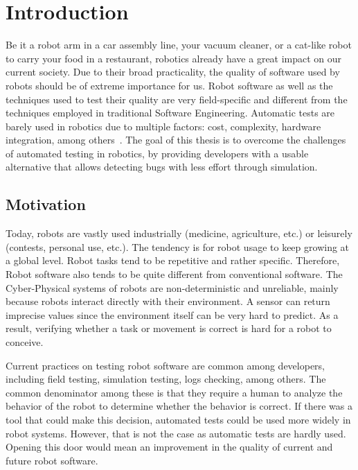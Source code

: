 \chapter{Introduction}
\label{chap:introduction}

Be it a robot arm in a car assembly line, your vacuum cleaner, or a cat-like robot to carry 
your food in a restaurant, robotics already have a great impact on our current society. 
Due to their broad practicality, the quality of software 
used by robots should be of extreme importance for us.
Robot software as well as the techniques used to test their quality are very 
field-specific and different from the techniques employed in traditional Software Engineering.
Automatic tests are barely used in robotics due to multiple factors:
cost, complexity, hardware integration, among others~\cite{TestRob}.
The goal of this thesis is to overcome the challenges of automated 
testing in robotics, by providing developers with a usable alternative 
that allows detecting bugs with less effort through simulation.


\section{Motivation}
\label{sec:motivation}

Today, robots are vastly used industrially (medicine, agriculture, etc.) 
or leisurely (contests, personal use, etc.).
The tendency is for robot usage to keep growing at a global level.
Robot tasks tend to be repetitive and rather specific.
Therefore, Robot software also tends to be quite different from conventional software.
The Cyber-Physical systems of robots are non-deterministic and unreliable, 
mainly because robots interact directly with their environment.
A sensor can return imprecise values since the environment itself can be very hard to predict.
As a result, verifying whether a task or movement is correct is hard for a robot to conceive.

\par

Current practices on testing robot software are common among developers, 
including field testing, simulation testing, logs checking, among others.
The common denominator among these is that they require a human to analyze 
the behavior of the robot to determine whether the behavior is correct. 
If there was a tool that could make this decision, automated tests 
could be used more widely in robot systems.
However, that is not the case as automatic tests are hardly used. 
Opening this door would mean an improvement in the 
quality of current and future robot software.


